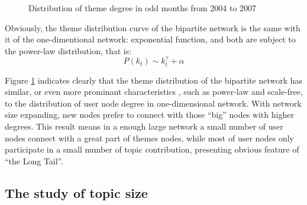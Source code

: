 \documentclass{elsarticle}
\begin{document}
\begin{figure}[htpb]
  \centering
  \subfigure[ ]{
     \scalebox{0.18}{\texttt{[image: 06-1]}}
   } \quad
  \subfigure[ ]{ 
       \scalebox{0.18}{\texttt{[image: 06-2]}}
   } 
  
    \subfigure[ ]{
     \scalebox{0.18}{\texttt{[image: 06-3]}}
   } \quad
  \subfigure[ ]{ 
       \scalebox{0.18}{\texttt{[image: 06-4]}}
   } 
  
    \subfigure[ ]{
     \scalebox{0.18}{\texttt{[image: 06-5]}}
   } \quad
  \subfigure[ ]{ 
       \scalebox{0.18}{\texttt{[image: 06-6]}}
   } 

    \subfigure[ ]{
     \scalebox{0.18}{\texttt{[image: 06-7]}}
   } \quad
  \subfigure[ ]{ 
       \scalebox{0.18}{\texttt{[image: 06-8]}}
   } 
   \caption{Distribution of theme degree in odd months from 2004 to
     2007}
   \label{fig:theme-degree}
\end{figure}

Obviously, the theme distribution curve of the bipartite network is the same with it of the one-dimentional network: exponential function, and both are subject to the power-law distribution, that is: 
\begin{equation}
  \label{eq:2}
  P(k_t)\sim k_t^{\gamma}+\alpha
\end{equation}

Figure  \ref{fig:theme-degree} indicates clearly that the theme distribution of the
bipartite network has similar, or even more prominant characteristics
, such as power-law and scale-free, 
to the distribution of user node degree in one-dimensional network.
With network size expanding,  new nodes prefer to connect with those
“big” nodes with higher degrees. This result means in a enough large
network a small number of user nodes connect with a great part of
themes nodes, while most of user nodes only participate in a small number of topic contribution, presenting obvious feature of “the Long Tail”. 
\subsection{The study of topic size}
\label{sec:topic-size}
\end{document}

